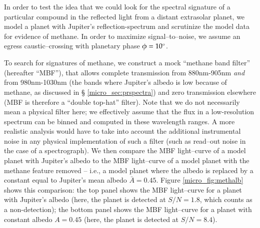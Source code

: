 In order to test the idea that we could look for the spectral
signature of a particular compound in the reflected light from a
distant extrasolar planet, we model a planet with Jupiter's
reflection-spectrum and scrutinize the model data for evidence of
methane.  In order to maximize signal--to--noise, we assume an egress
caustic--crossing with planetary phase $\phi=10\mbox{$^\circ$}$.

To search for signatures of methane, we construct a mock ``methane
band filter'' (hereafter ``MBF''), that allows complete transmission
from 880nm-905nm \emph{and} from 980nm-1030nm (the bands where
Jupiter's albedo is low because of methane, as discussed in \S
\ref{micro_sec:prspectra}) and zero transmission elsewhere (MBF is therefore
a ``double top-hat'' filter).  Note that we do not necessarily mean a
physical filter here; we effectively assume that the flux in a
low-resolution spectrum can be binned and computed in these wavelength
ranges. A more realistic analysis would have to take into account the
additional instrumental noise in any physical implementation of such a
filter (such as read--out noise in the case of a spectrograph).  We
then compare the MBF light--curve of a model planet with Jupiter's
albedo to the MBF light--curve of a model planet with the methane
feature removed -- i.e., a model planet where the albedo is replaced
by a constant equal to Jupiter's mean albedo $\bar{A}=0.45$.  Figure
\ref{micro_fig:methalb} shows this comparison: the top panel shows the MBF
light--curve for a planet with Jupiter's albedo (here, the planet is
detected at $S/N=1.8$, which counts as a non-detection); the bottom
panel shows the MBF light--curve for a planet with constant albedo
$A=0.45$ (here, the planet is detected at $S/N=8.4$).

